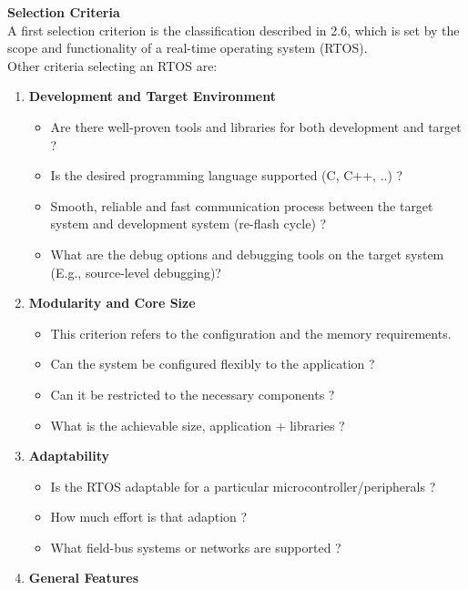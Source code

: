 {\rot\bf Selection Criteria}\\

A first selection criterion is the classification described in 2.6, which is set by the scope and functionality of a real-time operating system (RTOS).\\

Other criteria selecting an RTOS are:

\begin{enumerate}
\item  \textbf{Development and Target Environment}

\begin{itemize}
	\item  Are there well-proven tools and libraries for both development and target ?
	\item Is the desired programming language supported (C, C++, ..) ?
	\item Smooth, reliable and fast communication process between the  target system and development system (re-flash cycle) ?
	\item What are the debug options and debugging tools on the target system  (E.g., source-level debugging)?
\end{itemize}

\item  \textbf{Modularity and Core Size}

\begin{itemize}
	\item  This criterion refers to the configuration and the memory requirements.
	\item Can the system be configured flexibly to the application ?
	\item Can it be restricted to the necessary components ? 
	\item What is the achievable size, application + libraries ?
\end{itemize}

\item  \textbf{Adaptability}

\begin{itemize}
	\item Is the RTOS adaptable for a particular microcontroller/peripherals ?
	\item How much effort is that adaption ?
	\item What field-bus systems or networks are supported ?
\end{itemize}

\item  \textbf{General Features}


\end{enumerate}
